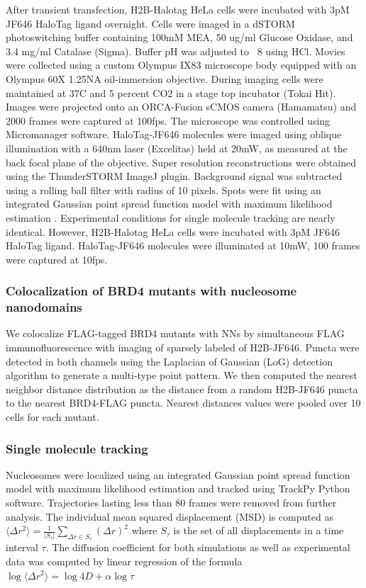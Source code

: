 After transient transfection, H2B-Halotag HeLa cells were incubated with 3pM JF646 HaloTag ligand overnight. Cells were imaged in a dSTORM photoswitching buffer containing 100mM MEA, 50 ug/ml Glucose Oxidase, and 3.4 mg/ml Catalase (Sigma). Buffer pH was adjusted to ~8 using HCl. Movies were collected using a custom Olympus IX83 microscope body equipped with an Olympus 60X 1.25NA oil-immersion objective. During imaging cells were maintained at 37C and 5 percent CO2 in a stage top incubator (Tokai Hit). Images were projected onto an ORCA-Fusion sCMOS camera (Hamamatsu) and 2000 frames were captured at 100fps. The microscope was controlled using Micromanager software. HaloTag-JF646 molecules were imaged using oblique illumination with a 640nm laser (Excelitas) held at 20mW, as measured at the back focal plane of the objective. Super resolution reconstructions were obtained using the ThunderSTORM ImageJ plugin. Background signal was subtracted using a rolling ball filter with radius of 10 pixels. Spots were fit using an integrated Gaussian point spread function model with maximum likelihood estimation \parencite{Smith2010,Huang2013}. Experimental conditions for single molecule tracking are nearly identical. However, H2B-Halotag HeLa cells were incubated with 3pM JF646 HaloTag ligand. HaloTag-JF646 molecules were illuminated at 10mW, 100 frames were captured at 10fps. 


\subsubsection{Colocalization of BRD4 mutants with nucleosome nanodomains}

We colocalize FLAG-tagged BRD4 mutants with NNs by simultaneous FLAG immunofluorescence with imaging of sparsely labeled of H2B-JF646. Puncta were detected in both channels using the Laplacian of Gaussian (LoG) detection algorithm to generate a multi-type point pattern. We then computed the nearest neighbor distance distribution as the distance from a random H2B-JF646 puncta to the nearest BRD4-FLAG puncta. Nearest distances values were pooled over 10 cells for each mutant. 

\subsubsection{Single molecule tracking}

Nucleosomes were localized using an integrated Gaussian point spread function model with maximum likelihood estimation \parencite{Smith2010,Huang2013} and tracked using TrackPy Python software.  Trajectories lasting less than 80 frames were removed from further analysis. The individual mean squared displacement (MSD) is computed as $\langle \Delta r^{2}\rangle = \frac{1}{\lvert S_{\tau}\lvert}\sum_{\Delta r \in S_{\tau}}(\Delta r)^{2}$
where $S_\tau$ is the set of all displacements in a time interval $\tau$. The diffusion coefficient for both simulations as well as experimental data was computed by linear regression of the formula $\log\langle \Delta r^{2}\rangle  = \log 4D + \alpha \log \tau$


